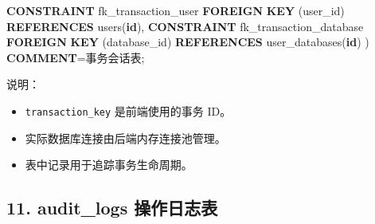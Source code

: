 \documentclass[
  a4paper,
  UTF8]{ctexart}
\newenvironment{Shaded}{}{}
\newcommand{\KeywordTok}[1]{\textcolor[rgb]{0.00,0.44,0.13}{\textbf{#1}}}
\newcommand{\NormalTok}[1]{#1}
\newcommand{\OperatorTok}[1]{\textcolor[rgb]{0.40,0.40,0.40}{#1}}
\newcommand{\StringTok}[1]{\textcolor[rgb]{0.25,0.44,0.63}{#1}}
\providecommand{\tightlist}{%
  \setlength{\itemsep}{0pt}\setlength{\parskip}{0pt}}
\begin{document}
\begin{Shaded}
\begin{Highlighting}[]
  \KeywordTok{CONSTRAINT}\NormalTok{ fk\_transaction\_user}
    \KeywordTok{FOREIGN} \KeywordTok{KEY}\NormalTok{ (user\_id) }\KeywordTok{REFERENCES}\NormalTok{ users(}\KeywordTok{id}\NormalTok{),}
  \KeywordTok{CONSTRAINT}\NormalTok{ fk\_transaction\_database}
    \KeywordTok{FOREIGN} \KeywordTok{KEY}\NormalTok{ (database\_id) }\KeywordTok{REFERENCES}\NormalTok{ user\_databases(}\KeywordTok{id}\NormalTok{)}
\NormalTok{) }\KeywordTok{COMMENT}\OperatorTok{=}\StringTok{\textquotesingle{}事务会话表\textquotesingle{}}\NormalTok{;}
\end{Highlighting}
\end{Shaded}

说明：

\begin{itemize}
\tightlist
\item
  \texttt{transaction\_key} 是前端使用的事务 ID。
\item
  实际数据库连接由后端内存连接池管理。
\item
  表中记录用于追踪事务生命周期。
\end{itemize}

\hypertarget{audit_logs-ux64cdux4f5cux65e5ux5fd7ux8868}{%
\subsection{11. audit\_logs
操作日志表}\label{audit_logs-ux64cdux4f5cux65e5ux5fd7ux8868}}
\end{document}
